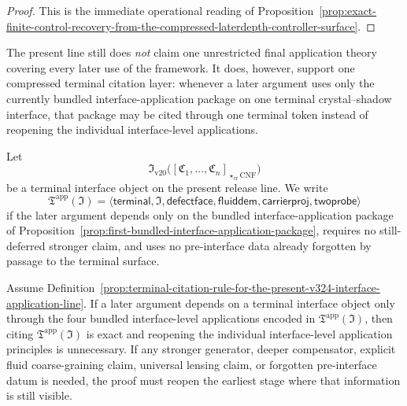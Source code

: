 \begin{proof}
This is the immediate operational reading of Proposition~\ref{prop:exact-finite-control-recovery-from-the-compressed-laterdepth-controller-surface}.
\end{proof}

\begin{remark}
\label{rem:status-of-the-terminal-interface-application-surface-in-the-present-v324-line}
The present line still does \emph{not} claim one unrestricted final application theory covering every later use of the framework. It does, however, support one compressed terminal citation layer: whenever a later argument uses only the currently bundled interface-application package on one terminal crystal--shadow interface, that package may be cited through one terminal token instead of reopening the individual interface-level applications.
\end{remark}

\begin{definition}
\label{prop:terminal-citation-rule-for-the-present-v324-interface-application-line}
Let
\[
\mathfrak I_{\mathrm{v20}}
\bigl([\mathfrak C_1,\dots,\mathfrak C_n]_{\star_{\mathrm{cr}}\mathrm{CNF}}\bigr)
\]
be a terminal interface object on the present release line. We write
\[
\mathfrak T^{\mathrm{app}}(\mathfrak I)
=
\langle
\mathsf{terminal},
\mathfrak I,
\mathsf{defectface},
\mathsf{fluiddem},
\mathsf{carrierproj},
\mathsf{twoprobe}
\rangle
\]
if the later argument depends only on the bundled interface-application package of Proposition~\ref{prop:first-bundled-interface-application-package}, requires no still-deferred stronger claim, and uses no pre-interface data already forgotten by passage to the terminal surface.
\end{definition}

\begin{proposition}
\label{cor:operational-mini-checklist-for-the-terminal-interface-application-surface}
Assume Definition~\ref{prop:terminal-citation-rule-for-the-present-v324-interface-application-line}. If a later argument depends on a terminal interface object only through the four bundled interface-level applications encoded in \(\mathfrak T^{\mathrm{app}}(\mathfrak I)\), then citing \(\mathfrak T^{\mathrm{app}}(\mathfrak I)\) is exact and reopening the individual interface-level application principles is unnecessary. If any stronger generator, deeper compensator, explicit fluid coarse-graining claim, universal lensing claim, or forgotten pre-interface datum is needed, the proof must reopen the earliest stage where that information is still visible.
\end{proposition}


